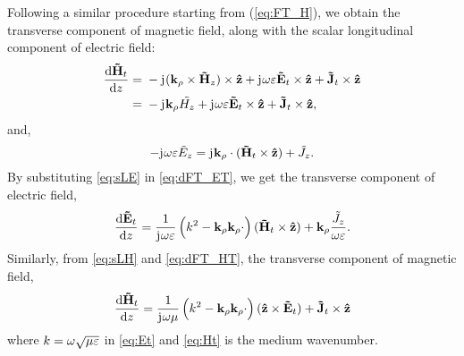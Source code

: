 \documentclass[12pt]{article}
\begin{document}
Following a similar procedure starting from (\ref{eq:FT_H}), we obtain the transverse component of magnetic field, along with the scalar longitudinal component of electric field:
%
\begin{equation}
  \begin{split}
    \dv{\v{\ti{H}}_t}{z} ={}& -\j (\v{k}_{\p} \x \v{\ti{H}}_z) \x \v{\^{z}}
    + \j \O \E \v{\ti{E}}_t \x \v{\^{z}} +
    \v{\ti{J}}_t \x \v{\^{z}} \\
    ={}& -\j \v{k}_{\p} \ti{{H}_z} + \j \O \E \v{\ti{E}}_t \x \v{\^{z}}  +
    \v{\ti{J}}_t \x \v{\^{z}},
  \end{split}
  \label{eq:dFT_HT}%
\end{equation}
%
and,
\begin{equation}
  -\mathrm{j}\mkern1mu \omega \varepsilon \tilde{E}_z =
  \mathrm{j}\mkern1mu \mathbf{k}_{\rho} \cdot (\mathbf{\tilde{H}}_t \times \mathbf{\hat{z}}) + \tilde{J}_z.
  \label{eq:FT_LE}
\end{equation}
%
By substituting \eqref{eq:sLE} in \eqref{eq:dFT_ET}, we get the transverse component of electric field,
%
\begin{equation}
  \dv{\mathbf{\tilde{E}}_t}{z} =
  \frac{1}{\mathrm{j}\mkern1mu \omega \varepsilon} \left( k^2 - \mathbf{k}_{\rho}\mathbf{k}_{\rho} \cdot \right) (\mathbf{\tilde{H}}_t \times \mathbf{\hat{z}}) + \mathbf{k}_{\rho} \frac{\tilde{J}_z}{\omega \varepsilon}.
  \label{eq:Et}
\end{equation}
%
Similarly, from \eqref{eq:sLH} and \eqref{eq:dFT_HT}, the transverse component of magnetic field,
%
\begin{equation}
  \dv{\mathbf{\tilde{H}}_t}{z} =
  \frac{1}{\mathrm{j}\mkern1mu \omega \mu} \left( k^2 - \mathbf{k}_{\rho}\mathbf{k}_{\rho} \cdot \right) (\mathbf{\hat{z}} \times \mathbf{\tilde{E}}_t) + \mathbf{\tilde{J}}_t
  \times \mathbf{\hat{z}}
  \label{eq:Ht}
\end{equation}
%
where $k = \omega \sqrt{\mu \varepsilon}$ in \eqref{eq:Et} and \eqref{eq:Ht} is the medium wavenumber.
\end{document}
